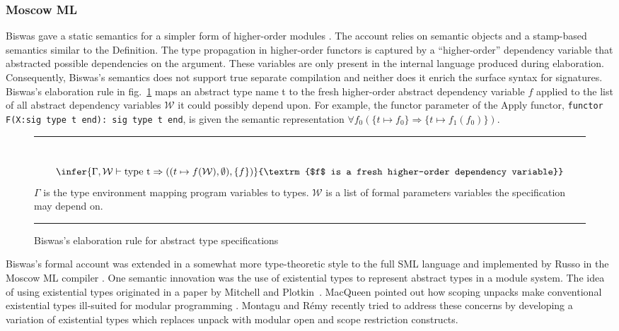 \subsubsection{Moscow ML}
Biswas gave a static semantics for a simpler form of higher-order modules \cite{biswas95}. The account relies on semantic objects and a stamp-based semantics similar to the Definition. The type propagation in higher-order functors is captured by a ``higher-order'' dependency variable that abstracted possible dependencies on the argument. These variables are only present in the internal language produced during elaboration. Consequently, Biswas's semantics does not support true separate compilation and neither does it enrich the surface syntax for signatures. Biswas's elaboration rule in fig.~\ref{fig:biswas-abstypespec-elab} maps an abstract type name t to the fresh higher-order abstract dependency variable $f$ applied to the list of all abstract dependency variables $\mathcal{W}$ it could possibly depend upon. For example, the functor parameter of the Apply functor, \lstinline{functor F(X:sig type t end): sig type t end}, is given the semantic representation $\forall f_0(\{t\mapsto f_0\} \Rightarrow \{t\mapsto f_1(f_0)\})$.

\begin{figure}
\hrule
~\\
\[
\infer {\Gamma,\mathcal{W}\vdash\mathrm{type~t}\Rightarrow ((t \mapsto f(\mathcal{W}), \emptyset), \{f\})}
{\textrm{$f$ is a fresh higher-order dependency variable}}
\]
$\Gamma$ is the type environment mapping program variables to types. $\mathcal{W}$ is a list of formal parameters variables the specification may depend on.
\hrule
\caption{Biswas's elaboration rule for abstract type specifications}
\label{fig:biswas-abstypespec-elab}
\end{figure}


Biswas's formal account was extended in a somewhat more type-theoretic
style to the full SML language and implemented by Russo in the Moscow
ML compiler \cite{russothesis}. One semantic
innovation was the use of existential types to represent abstract
types in a module system. The idea of using existential types
originated in a paper by Mitchell and
Plotkin~\cite{mitchellplotkin:popl85}. MacQueen pointed out how
scoping unpacks make conventional existential types ill-suited for
modular programming \cite{macqueen:popl86}. Montagu and R\'emy
\cite{Montagu-Remy:popl09:fzip} recently tried to address these
concerns by developing a variation of existential types which replaces
unpack with modular open and scope restriction constructs. 

